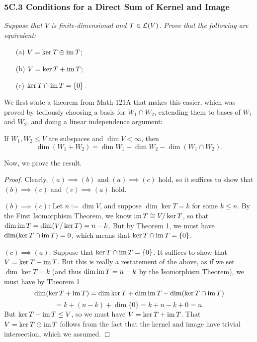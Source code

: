 \documentclass{article}
\begin{document}
\subsubsection*{5C.3 Conditions for a Direct Sum of Kernel and Image}
\textit{Suppose that $V$ is finite-dimensional and $T\in \mathcal L(V)$. Prove that the following are equivalent:}
\begin{itemize}
    \item[(a)] $V = \ker T \oplus \operatorname{im} T$;
    \item[(b)] $V = \ker T + \operatorname{im} T$;
    \item[(c)] $\ker T \cap \operatorname{im} T = \{0\}$.
\end{itemize}

We first state a theorem from Math 121A that makes this easier, which was proved by tediously choosing a basis for $W_1\cap W_2$, extending them to bases of $W_1$ and $W_2$, and doing a linear independence argument:



\begin{theorem*}
If $W_1, W_2 \leq V$ are subspaces and $\dim V < \infty$, then
$$\dim(W_1 + W_2) = \dim W_1 + \dim W_2 - \dim(W_1 \cap W_2).$$
\end{theorem*}

Now, we prove the result.

\begin{proof}
Clearly, $(a)\implies (b)$ and $(a)\implies (c)$ hold, so it suffices to show that $(b)\implies (c)$ and $(c)\implies (a)$ hold.

$(b)\implies (c)$: Let $n := \dim V$, and suppose $\dim\ker T = k$ for some $k\leq n$. By the First Isomorphism Theorem, we know $\operatorname{im} T \cong V/\ker T$, so that $\dim\operatorname{im} T = \dim(V /\ker T) = n-k$. But by Theorem 1, we must have $\dim(\ker T \cap \operatorname{im} T) = 0$, which means that $\ker T\cap \operatorname{im} T = \{0\}$.

$(c)\implies (a)$: Suppose that $\ker T\cap \operatorname{im} T = \{0\}$. It suffices to show that $V = \ker T+\operatorname{im} T$. But this is really a restatement of the above, as if we set $\dim\ker T = k$ (and thus $\dim\operatorname{im} T = n-k$ by the Isomorphism Theorem), we must have by Theorem 1
$$\dim(\ker T + \operatorname{im} T) = \dim\ker T + \dim\operatorname{im} T - \dim(\ker T\cap \operatorname{im} T)$$
$$=k + (n-k) + \dim\{0\} = k + n-k + 0 = n.$$
But $\ker T+\operatorname{im} T \leq V$, so we must have $V = \ker T + \operatorname{im} T$. That $V = \ker T\oplus \operatorname{im} T$ follows from the fact that the kernel and image have trivial intersection, which we assumed.
\end{proof}
\end{document}
